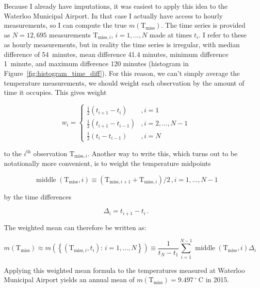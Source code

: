 \documentclass[letter]{article}
\newcommand{\genericdel}[3]{%
      \left#1#3\right#2
    }
\newcommand{\del}[1]{\genericdel(){#1}}
\newcommand{\cbr}[1]{\genericdel\{\}{#1}}
\newcommand{\T}{\mathrm{T}}
\newcommand{\degreeC}{{}^{\circ}~\mathrm{C}}
\newcommand{\miss}{\mathrm{miss}}
\newcommand{\mean}{m}
\DeclareMathOperator{\midpoint}{middle}
\begin{document}
        Because I already have imputations, it was easiest to apply this idea to the Waterloo Municipal Airport.
In that case I actually have access to hourly measurements, so I can compute the true \(\mean\del{\T_\miss}\).
The time series is provided as \(N=12,695\) measurements \(\T_{\miss,i}\), \(i=1,\dotsc,N\) made at times \(t_i\).
I refer to these as hourly measurements, but in reality the time series is irregular, with median difference of 54~minutes, mean difference 41.4 minutes, minimum difference 1~minute, and maximum difference 120 minutes (histogram in Figure~\ref{fig:histogram_time_diff}).
For this reason, we can't simply average the temperature measurements, we should weight each observation by the amount of time it occupies.
This gives weight

\begin{equation}
w_i = \begin{cases}
    \frac{1}{2}\del{t_{i+1}-t_i} & ,i=1 \\
    \frac{1}{2}\del{t_{i+1}-t_{i-1}} & ,i=2,\dotsc,N-1 \\
    \frac{1}{2}\del{t_{i}-t_{i-1}} & ,i = N
    \end{cases}
\end{equation}

to the \(i^\text{th}\) observation \(\T_{\miss,i}\).
Another way to write this, which turns out to be notationally more convenient, is to weight the temperature midpoints

\begin{equation}
    \midpoint\del{\T_{\miss}, i} \equiv \del{ \T_{\miss,i+1} + \T_{\miss,i} } \big/ 2 \,,i=1,\dotsc,N-1
\end{equation}

by the time differences

\begin{equation}
    \Delta_i = t_{i+1}-t_i\,.
\end{equation}

The weighted mean can therefore be written as:

\begin{equation}
    \mean\del{\T_\miss} 
        \approx 
        \mean\del{
            \cbr{
                \del{\T_{\miss,i},t_i}: \,i=1,\dotsc,N
            }
        }
        \equiv 
        \frac{1}{t_N - t_1} \sum_{i=1}^{N-1} \midpoint\del{\T_{\miss}, i} \Delta_i
\label{eq:weighted_mean}
\end{equation}

Applying this weighted mean formula to the temperatures measured at Waterloo Municipal Airport yields an annual mean of \(\mean\del{\T_\miss} = 9.497\,\degreeC\) in 2015.
    
\end{document}
